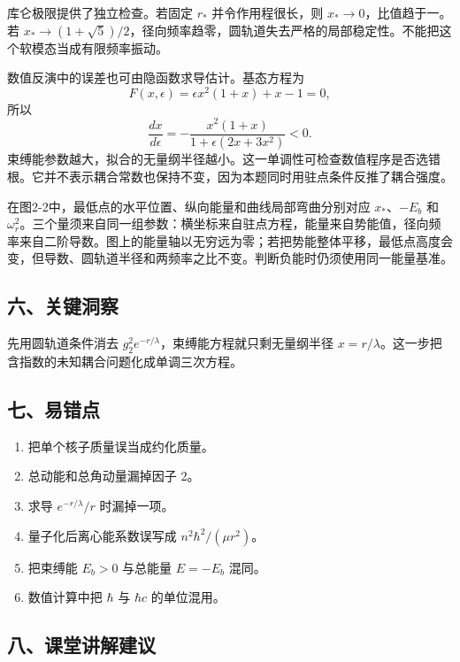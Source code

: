 \documentclass[12pt,a4paper,UTF8]{ctexart}
\newcommand{\tightlist}{\setlength{\itemsep}{0pt}\setlength{\parskip}{0pt}}
\begin{document}
库仑极限提供了独立检查。若固定 \(r_*\) 并令作用程很长，则
\(x_*\to0\)，比值趋于一。若
\(x_*\to(1+\sqrt5)/2\)，径向频率趋零，圆轨道失去严格的局部稳定性。不能把这个软模态当成有限频率振动。

数值反演中的误差也可由隐函数求导估计。基态方程为 \[
F(x,\epsilon)=\epsilon x^2(1+x)+x-1=0,
\] 所以 \[
\frac{dx}{d\epsilon}=-\frac{x^2(1+x)}{1+\epsilon(2x+3x^2)}<0.
\]
束缚能参数越大，拟合的无量纲半径越小。这一单调性可检查数值程序是否选错根。它并不表示耦合常数也保持不变，因为本题同时用驻点条件反推了耦合强度。

在图2-2中，最低点的水平位置、纵向能量和曲线局部弯曲分别对应
\(x_*\)、\(-E_b\) 和
\(\omega_r^2\)。三个量须来自同一组参数：横坐标来自驻点方程，能量来自势能值，径向频率来自二阶导数。图上的能量轴以无穷远为零；若把势能整体平移，最低点高度会变，但导数、圆轨道半径和两频率之比不变。判断负能时仍须使用同一能量基准。

\subsection{六、关键洞察}\label{ux516dux5173ux952eux6d1eux5bdf-1}

先用圆轨道条件消去 \(g_2^2e^{-r/\lambda}\)，束缚能方程就只剩无量纲半径
\(x=r/\lambda\)。这一步把含指数的未知耦合问题化成单调三次方程。

\subsection{七、易错点}\label{ux4e03ux6613ux9519ux70b9-1}

\begin{enumerate}
\def\labelenumi{\arabic{enumi}.}
\tightlist
\item
  把单个核子质量误当成约化质量。
\item
  总动能和总角动量漏掉因子 2。
\item
  求导 \(e^{-r/\lambda}/r\) 时漏掉一项。
\item
  量子化后离心能系数误写成 \(n^2\hbar^2/(\mu r^2)\)。
\item
  把束缚能 \(E_b>0\) 与总能量 \(E=-E_b\) 混同。
\item
  数值计算中把 \(\hbar\) 与 \(\hbar c\) 的单位混用。
\end{enumerate}

\subsection{八、课堂讲解建议}\label{ux516bux8bfeux5802ux8bb2ux89e3ux5efaux8bae-1}
\end{document}
